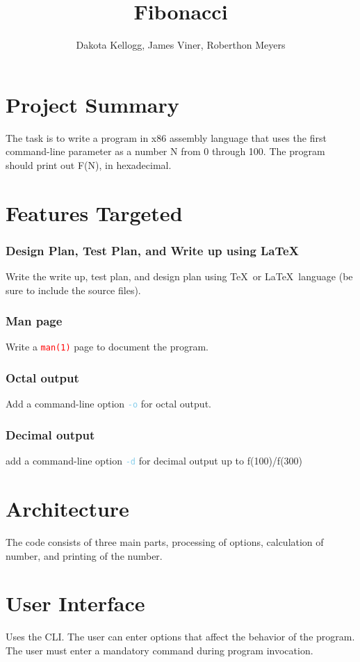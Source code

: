 \documentclass{article}
\title{Fibonacci}
\author{Dakota Kellogg, James Viner, Roberthon Meyers}
\date{}
\newcommand{\code}[1]{\textcolor{SkyBlue}{\texttt{#1}}}
\newcommand{\co}[1]{\textcolor{red}{\texttt{#1}}}
\begin{document}
\maketitle

\section*{Project Summary}
The task is to write a program in x86 assembly language that uses the first command-line parameter as a number N from 0 through 100. The program should print out F(N), in hexadecimal. 

\section*{Features Targeted}

\subsubsection*{Design Plan, Test Plan, and Write up using \LaTeX}
Write the write up, test plan, and design plan using \TeX~or \LaTeX~language
(be sure to include the source files).

\subsubsection*{Man page}
Write a \co{man(1)} page to document the program.

\subsubsection*{Octal output}
Add a command-line option \code{-o} for octal output.  

\subsubsection*{Decimal output}
add a command-line option \code{-d} for decimal output up to f(100)/f(300)

\pagebreak
\section*{Architecture}
The code consists of three main parts, processing of options, calculation of number, and printing of the number.

\section*{User Interface}
\noindent
Uses the CLI. The user can enter options that affect the behavior of the
program. The user must enter a mandatory command during program invocation. 
\end{document}
